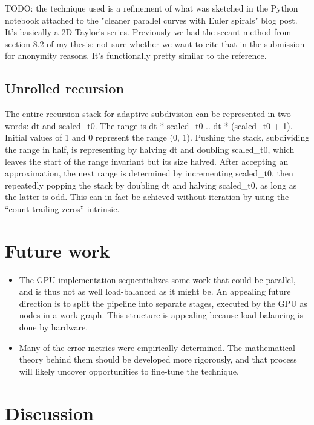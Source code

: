 \documentclass[format=acmsmall]{acmart}
\begin{document}
TODO: the technique used is a refinement of what was sketched in the Python notebook attached to the "cleaner parallel curves with Euler spirals" blog post. It's basically a 2D Taylor's series. Previously we had the secant method from section 8.2 of my thesis; not sure whether we want to cite that in the submission for anonymity reasons. It's functionally pretty similar to the \cite{Connor2014} reference.

\subsection{Unrolled recursion}

The entire recursion stack for adaptive subdivision can be represented in two words: dt and scaled\_t0. The range is dt * scaled\_t0 .. dt * (scaled\_t0 + 1). Initial values of 1 and 0 represent the range (0, 1). Pushing the stack, subdividing the range in half, is representing by halving dt and doubling scaled\_t0, which leaves the start of the range invariant but its size halved. After accepting an approximation, the next range is determined by incrementing scaled\_t0, then repeatedly popping the stack by doubling dt and halving scaled\_t0, as long as the latter is odd. This can in fact be achieved without iteration by using the ``count trailing zeros'' intrinsic.

\section{Future work}

\begin{itemize}
    \item The GPU implementation sequentializes some work that could be parallel, and is thus not as well load-balanced as it might be. An appealing future direction is to split the pipeline into separate stages, executed by the GPU as nodes in a work graph\cite{Patel2024}. This structure is appealing because load balancing is done by hardware.

    \item Many of the error metrics were empirically determined. The mathematical theory behind them should be developed more rigorously, and that process will likely uncover opportunities to fine-tune the technique.
\end{itemize}

\section{Discussion}



\end{document}
